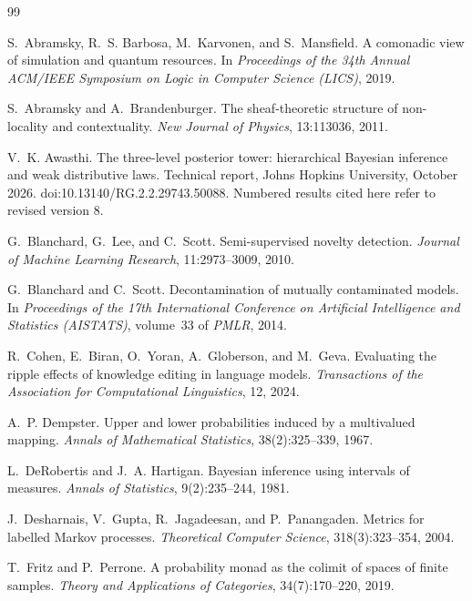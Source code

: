 \documentclass[11pt]{article}
\theoremstyle{definition}
\theoremstyle{remark}
\begin{document}
\begin{thebibliography}{99}

S.~Abramsky, R.~S. Barbosa, M.~Karvonen, and S.~Mansfield.
\newblock A comonadic view of simulation and quantum resources.
\newblock In \emph{Proceedings of the 34th Annual ACM/IEEE Symposium on Logic in Computer Science
  (LICS)}, 2019.

S.~Abramsky and A.~Brandenburger.
\newblock The sheaf-theoretic structure of non-locality and contextuality.
\newblock \emph{New Journal of Physics}, 13:113036, 2011.

V.~K. Awasthi.
\newblock The three-level posterior tower: hierarchical Bayesian inference and weak distributive laws.
\newblock Technical report, Johns Hopkins University, October 2026.
\newblock doi:10.13140/RG.2.2.29743.50088. Numbered results cited here refer to revised version 8.

G.~Blanchard, G.~Lee, and C.~Scott.
\newblock Semi-supervised novelty detection.
\newblock \emph{Journal of Machine Learning Research}, 11:2973--3009, 2010.

G.~Blanchard and C.~Scott.
\newblock Decontamination of mutually contaminated models.
\newblock In \emph{Proceedings of the 17th International Conference on Artificial Intelligence and
  Statistics (AISTATS)}, volume~33 of \emph{PMLR}, 2014.

R.~Cohen, E.~Biran, O.~Yoran, A.~Globerson, and M.~Geva.
\newblock Evaluating the ripple effects of knowledge editing in language models.
\newblock \emph{Transactions of the Association for Computational Linguistics}, 12, 2024.

A.~P. Dempster.
\newblock Upper and lower probabilities induced by a multivalued mapping.
\newblock \emph{Annals of Mathematical Statistics}, 38(2):325--339, 1967.

L.~DeRobertis and J.~A. Hartigan.
\newblock Bayesian inference using intervals of measures.
\newblock \emph{Annals of Statistics}, 9(2):235--244, 1981.

J.~Desharnais, V.~Gupta, R.~Jagadeesan, and P.~Panangaden.
\newblock Metrics for labelled {M}arkov processes.
\newblock \emph{Theoretical Computer Science}, 318(3):323--354, 2004.

T.~Fritz and P.~Perrone.
\newblock A probability monad as the colimit of spaces of finite samples.
\newblock \emph{Theory and Applications of Categories}, 34(7):170--220, 2019.


\end{thebibliography}
\end{document}

